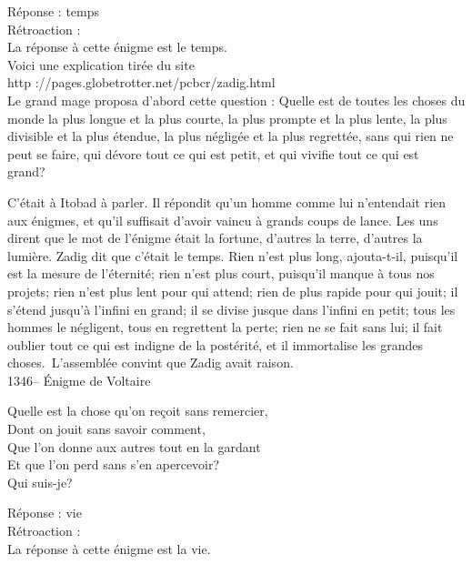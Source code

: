 ﻿\documentclass[letterpaper, 12pt]{article}
\begin{document}
R\'eponse : temps\\

R\'etroaction : \\
La r\'eponse \`a cette \'enigme est le temps.  \\
Voici une explication tir\'ee du site\\
http ://pages.globetrotter.net/pcbcr/zadig.html\\

Le grand mage proposa d'abord cette question : \og Quelle est de
toutes les choses du monde la plus longue et la plus courte, la plus
prompte et la plus lente, la plus divisible et la plus \'etendue, la
plus n\'eglig\'ee et la plus regrett\'ee, sans qui rien ne peut se
faire, qui d\'evore tout ce qui est petit, et qui vivifie tout ce
qui est grand?\fg\

C'\'etait \`a Itobad \`a parler. Il r\'epondit qu'un homme comme lui
n'entendait rien aux \'enigmes, et qu'il suffisait d'avoir vaincu
\`a grands coups de lance. Les uns dirent que le mot de l'\'enigme
\'etait la fortune, d'autres la terre, d'autres la lumi\`ere. Zadig
dit que c'\'etait le temps. \og Rien n'est plus long, ajouta-t-il,
puisqu'il est la mesure de l'\'eternit\'e; rien n'est plus court,
puisqu'il manque \`a tous nos projets; rien n'est plus lent pour qui
attend; rien de plus rapide pour qui jouit; il s'\'etend jusqu'\`a
l'infini en grand; il se divise jusque dans l'infini en petit; tous
les hommes le n\'egligent, tous en regrettent la perte; rien ne se
fait sans lui; il fait oublier tout ce qui est indigne de la
post\'erit\'e, et il immortalise les grandes choses.\fg\
L'assembl\'ee convint que Zadig avait raison.\\


1346-- \'Enigme de Voltaire\\
\begin{center}{Quelle est la chose qu'on re\c coit sans remercier, \\
Dont on jouit sans savoir comment,\\
Que l'on donne aux autres tout en la gardant\\
Et que l'on perd sans s'en apercevoir?\\
Qui suis-je?\\}
\end{center}

R\'eponse : vie\\

R\'etroaction : \\
La r\'eponse \`a cette \'enigme est la vie.\\
\end{document}
